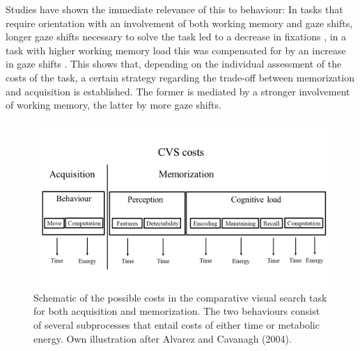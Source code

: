 Studies have shown the immediate relevance of this to behaviour: In tasks that require orientation with an involvement of both working memory and gaze shifts, longer gaze shifts necessary to solve the task led to a decrease in fixations \citep{ballard1995memory}, in a task with higher working memory load this was compensated for by an increase in gaze shifts \citep{drollTradeoffsGazeWorking2007}. 
This shows that, depending on the individual assessment of the costs of the task, a certain strategy regarding the trade-off between memorization and acquisition is established. The former is mediated by a stronger involvement of working memory, the latter by more gaze shifts.
\newline
\begin{figure}[H]
    \centering
    \includegraphics[width=\textwidth]{Figures/cvs costs.png}
    \caption[CVS costs]{Schematic of the possible costs in the comparative visual search task for both acquisition and memorization. The two behaviours consist of several subprocesses that entail costs of either time or metabolic energy. Own illustration after Alvarez and Cavanagh (2004).}
    \label{fig:cvs_costs}
\end{figure}

